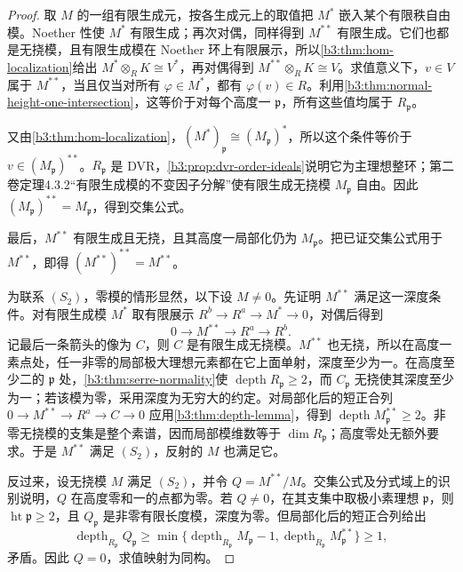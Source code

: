 \begin{proof}
	取 \(M\) 的一组有限生成元，按各生成元上的取值把 \(M^*\) 嵌入某个有限秩自由模。Noether 性使 \(M^*\) 有限生成；再次对偶，同样得到 \(M^{**}\) 有限生成。它们也都是无挠模，且有限生成模在 Noether 环上有限展示，所以\cref{b3:thm:hom-localization}给出 \(M^*\otimes_RK\cong V^*\)，再对偶得到 \(M^{**}\otimes_RK\cong V\)。求值意义下，\(v\in V\) 属于 \(M^{**}\)，当且仅当对所有 \(\varphi\in M^*\)，都有 \(\varphi(v)\in R\)。利用\cref{b3:thm:normal-height-one-intersection}，这等价于对每个高度一 \(\mathfrak p\)，所有这些值均属于 \(R_{\mathfrak p}\)。

	又由\cref{b3:thm:hom-localization}，\((M^*)_{\mathfrak p}\cong(M_{\mathfrak p})^*\)，所以这个条件等价于 \(v\in(M_{\mathfrak p})^{**}\)。\(R_{\mathfrak p}\) 是 DVR，\cref{b3:prop:dvr-order-ideals}说明它为主理想整环；第二卷定理4.3.2“有限生成模的不变因子分解”使有限生成无挠模 \(M_{\mathfrak p}\) 自由。因此 \((M_{\mathfrak p})^{**}=M_{\mathfrak p}\)，得到交集公式。

	最后，\(M^{**}\) 有限生成且无挠，且其高度一局部化仍为 \(M_{\mathfrak p}\)。把已证交集公式用于 \(M^{**}\)，即得 \((M^{**})^{**}=M^{**}\)。

	为联系 \((S_2)\)，零模的情形显然，以下设 \(M\ne0\)。先证明 \(M^{**}\) 满足这一深度条件。对有限生成模 \(M^*\) 取有限展示 \(R^b\to R^a\to M^*\to0\)，对偶后得到
	\[
		0\longrightarrow M^{**}\longrightarrow R^a\longrightarrow R^b.
	\]
	记最后一条箭头的像为 \(C\)，则 \(C\) 是有限生成无挠模。\(M^{**}\) 也无挠，所以在高度一素点处，任一非零的局部极大理想元素都在它上面单射，深度至少为一。在高度至少二的 \(\mathfrak p\) 处，\cref{b3:thm:serre-normality}使 \(\operatorname{depth}R_{\mathfrak p}\ge2\)，而 \(C_{\mathfrak p}\) 无挠使其深度至少为一；若该模为零，采用深度为无穷大的约定。对局部化后的短正合列 \(0\to M^{**}\to R^a\to C\to0\) 应用\cref{b3:thm:depth-lemma}，得到 \(\operatorname{depth}M^{**}_{\mathfrak p}\ge2\)。非零无挠模的支集是整个素谱，因而局部模维数等于 \(\dim R_{\mathfrak p}\)；高度零处无额外要求。于是 \(M^{**}\) 满足 \((S_2)\)，反射的 \(M\) 也满足它。

	反过来，设无挠模 \(M\) 满足 \((S_2)\)，并令 \(Q=M^{**}/M\)。交集公式及分式域上的识别说明，\(Q\) 在高度零和一的点都为零。若 \(Q\ne0\)，在其支集中取极小素理想 \(\mathfrak p\)，则 \(\operatorname{ht}\mathfrak p\ge2\)，且 \(Q_{\mathfrak p}\) 是非零有限长度模，深度为零。但局部化后的短正合列给出
	\[
		\operatorname{depth}_{R_{\mathfrak p}}Q_{\mathfrak p} \ge\min\{\operatorname{depth}_{R_{\mathfrak p}}M_{\mathfrak p}-1, \operatorname{depth}_{R_{\mathfrak p}}M^{**}_{\mathfrak p}\} \ge1,
	\]
	矛盾。因此 \(Q=0\)，求值映射为同构。


\end{proof}
